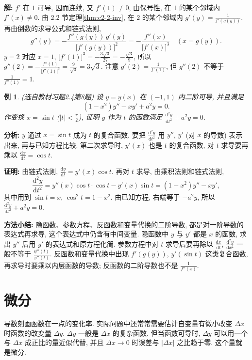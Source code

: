 \documentclass[UTF8,openany]{ctexbook}
\theoremstyle{chinesetextbook}
\newtheorem{example}{例}[section]
\newenvironment{cnproof}{\par\indent\textbf{证明:} \ignorespaces}{\par}
\newenvironment{cnsolution}{\par\indent\textbf{解:} \ignorespaces}{\par}
\newcommand{\dd}{\mathrm d}
\begin{document}
\begin{cnsolution}
$f'$ 在 $1$ 可导, 因而连续, 又 $f'(1)\ne0$, 由保号性, 在 $1$ 的某个邻域内 $f'(x)\ne0$. 由 2.2 节定理\ref{thm:c2-2-inv}, 在 $2$ 的某个邻域内 $\displaystyle g'(y)=\frac1{f'(g(y))}$. 再由倒数的求导公式和链式法则,
\[
g''(y)=-\frac{f''(g(y))\,g'(y)}{\bigl[f'(g(y))\bigr]^2}=-\frac{f''(x)}{\bigl[f'(x)\bigr]^3}\quad(x=g(y)).
\]
$y=2$ 对应 $x=1$, $\displaystyle\bigl[f'(1)\bigr]^3=-\frac{3\sqrt3}{27}=-\frac{\sqrt3}9$, 所以 $\displaystyle g''(2)=-\frac{f''(1)}{\bigl[f'(1)\bigr]^3}=\frac9{\sqrt3}=3\sqrt3$. 注意 $\displaystyle g'(2)=\frac1{f'(1)}$, 但 $g''(2)$ 不等于 $\displaystyle\frac1{f''(1)}=1$.
\end{cnsolution}
\begin{example}\label{ex:c2-h4-8}
\textnormal{(选自教材习题2.4第8题)} 设 $y=y(x)$ 在 $(-1,1)$ 内二阶可导, 并且满足
\[
(1-x^2)y''-xy'+a^2y=0.
\]
作变换 $x=\sin t$ ($\displaystyle|t|<\frac\pi2$), 证明 $y$ 作为 $t$ 的函数满足 $\displaystyle\frac{\dd^2y}{\dd t^2}+a^2y=0$.
\end{example}
\par\indent\textbf{分析:} $y$ 通过 $x=\sin t$ 成为 $t$ 的复合函数. 要把 $\displaystyle\frac{\dd^2y}{\dd t^2}$ 用 $y''$, $y'$ (对 $x$ 的导数) 表示出来, 再与已知方程比较. 第二次求导时, $y'(x)$ 也是 $t$ 的复合函数, 对 $t$ 求导要再乘以 $\displaystyle\frac{\dd x}{\dd t}=\cos t$.
\begin{cnproof}
由链式法则, $\displaystyle\frac{\dd y}{\dd t}=y'(x)\cos t$. 再对 $t$ 求导, 由乘积法则和链式法则,
\[
\frac{\dd^2y}{\dd t^2}=y''(x)\cos t\cdot\cos t-y'(x)\sin t=(1-x^2)y''-xy',
\]
其中用到 $\sin t=x$, $\cos^2t=1-x^2$. 由已知方程, 右端等于 $-a^2y$, 所以 $\displaystyle\frac{\dd^2y}{\dd t^2}+a^2y=0$.
\end{cnproof}
\par\indent\textbf{方法小结:} 隐函数、参数方程、反函数和变量代换的二阶导数, 都是对一阶导数的表达式再求导, 这个表达式中仍含有中间变量. 隐函数中 $y$ 与 $y'$ 都是 $x$ 的函数, 求出 $y''$ 后用 $y'$ 的表达式和原方程化简. 参数方程中对 $t$ 求导后要再除以 $\displaystyle\frac{\dd x}{\dd t}$, $\displaystyle\frac{\dd^2y}{\dd x^2}$ 一般不等于 $\displaystyle\frac{\psi''(t)}{\varphi''(t)}$. 反函数和变量代换中出现 $f'(g(y))$, $y'(\sin t)$ 这类复合函数, 再求导时要乘以内层函数的导数; 反函数的二阶导数也不是 $\displaystyle\frac1{f''(x)}$.
\section{微分}
导数刻画函数在一点的变化率. 实际问题中还常常需要估计自变量有微小改变 $\Delta x$ 时函数的改变量 $\Delta y$. $\Delta y$ 一般是 $\Delta x$ 的复杂函数. 但当函数可导时, $\Delta y$ 可以用一个与 $\Delta x$ 成正比的量近似代替, 并且 $\Delta x\to0$ 时误差与 $|\Delta x|$ 之比趋于零. 这个量就是微分.
\end{document}

